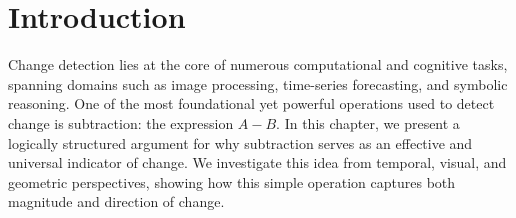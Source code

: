 \section{Introduction}
Change detection lies at the core of numerous computational and cognitive tasks, spanning domains such as image processing, time-series forecasting, and symbolic reasoning. One of the most foundational yet powerful operations used to detect change is subtraction: the expression $A - B$. In this chapter, we present a logically structured argument for why subtraction serves as an effective and universal indicator of change. We investigate this idea from temporal, visual, and geometric perspectives, showing how this simple operation captures both magnitude and direction of change.